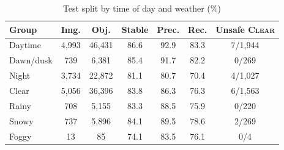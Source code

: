 \begin{table}[t]
\centering
\caption{Test split by time of day and weather (\%)}
\label{tab:groups}
\footnotesize
\setlength{\tabcolsep}{3pt}
\begin{tabular}{lcccccc}
\hline
Group & Img. & Obj. & Stable & Prec. & Rec. & Unsafe \textsc{Clear} \\
\hline
Daytime & 4{,}993 & 46{,}431 & 86.6 & 92.9 & 83.3 & 7/1{,}944 \\
Dawn/dusk & 739 & 6{,}381 & 85.4 & 91.7 & 82.2 & 0/269 \\
Night & 3{,}734 & 22{,}872 & 81.1 & 80.7 & 70.4 & 4/1{,}027 \\
Clear & 5{,}056 & 36{,}396 & 83.8 & 86.3 & 76.3 & 6/1{,}563 \\
Rainy & 708 & 5{,}155 & 83.3 & 88.5 & 75.9 & 0/220 \\
Snowy & 737 & 5{,}896 & 84.1 & 89.5 & 78.6 & 2/269 \\
Foggy & 13 & 85 & 74.1 & 83.5 & 76.1 & 0/4 \\
\hline
\end{tabular}
\end{table}
